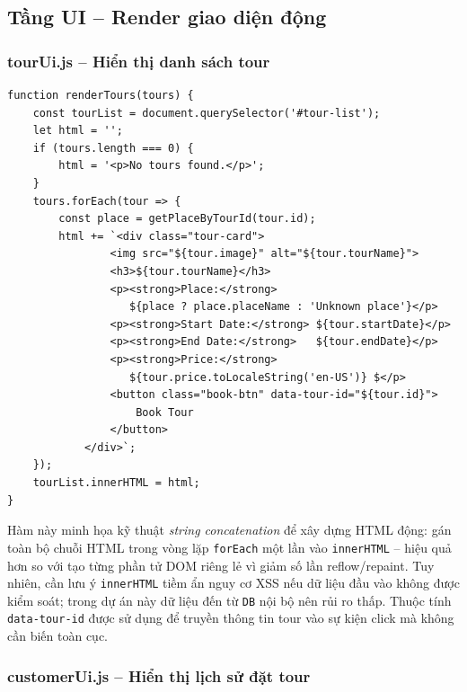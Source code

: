 \documentclass[12pt,a4paper]{article}
\begin{document}
\subsection{Tầng UI -- Render giao diện động}

\subsubsection{tourUi.js -- Hiển thị danh sách tour}

\begin{lstlisting}[caption={tourUi.js -- Render danh sách tour ra DOM}]
function renderTours(tours) {
    const tourList = document.querySelector('#tour-list');
    let html = '';
    if (tours.length === 0) {
        html = '<p>No tours found.</p>';
    }
    tours.forEach(tour => {
        const place = getPlaceByTourId(tour.id);
        html += `<div class="tour-card">
                <img src="${tour.image}" alt="${tour.tourName}">
                <h3>${tour.tourName}</h3>
                <p><strong>Place:</strong>
                   ${place ? place.placeName : 'Unknown place'}</p>
                <p><strong>Start Date:</strong> ${tour.startDate}</p>
                <p><strong>End Date:</strong>   ${tour.endDate}</p>
                <p><strong>Price:</strong>
                   ${tour.price.toLocaleString('en-US')} $</p>
                <button class="book-btn" data-tour-id="${tour.id}">
                    Book Tour
                </button>
            </div>`;
    });
    tourList.innerHTML = html;
}
\end{lstlisting}

Hàm này minh họa kỹ thuật \textit{string concatenation} để xây dựng HTML động: gán toàn bộ chuỗi HTML trong vòng lặp \texttt{forEach} một lần vào \texttt{innerHTML} -- hiệu quả hơn so với tạo từng phần tử DOM riêng lẻ vì giảm số lần reflow/repaint. Tuy nhiên, cần lưu ý \texttt{innerHTML} tiềm ẩn nguy cơ XSS nếu dữ liệu đầu vào không được kiểm soát; trong dự án này dữ liệu đến từ \texttt{DB} nội bộ nên rủi ro thấp. Thuộc tính \texttt{data-tour-id} được sử dụng để truyền thông tin tour vào sự kiện click mà không cần biến toàn cục.

\subsubsection{customerUi.js -- Hiển thị lịch sử đặt tour}
\end{document}
